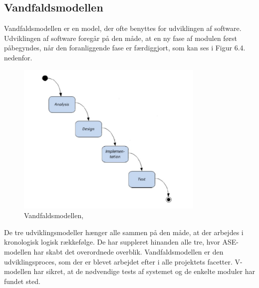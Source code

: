 \subsection{Vandfaldsmodellen}
Vandfaldsmodellen er en model, der ofte benyttes for udviklingen af software. Udviklingen af software foregår på den måde, at en ny fase af modulen først påbegyndes, når den foranliggende fase er færdiggjort, som kan ses i Figur 6.4. nedenfor. 
\begin{figure}[H]
	\centering
	\includegraphics[width=0.8\textwidth]{Figurer/vfmodel}
	\caption{Vandfaldsmodellen, \protect\cite{ISE}}
\end{figure}
De tre udviklingsmodeller hænger alle sammen på den måde, at der arbejdes i kronologisk logisk rækkefølge. De har suppleret hinanden alle tre, hvor ASE-modellen har skabt det overordnede overblik. Vandfaldsmodellen er den udviklingsproces, som der er blevet arbejdet efter i alle projektets facetter. V-modellen har sikret, at de nødvendige tests af systemet og de enkelte moduler har fundet sted. 



